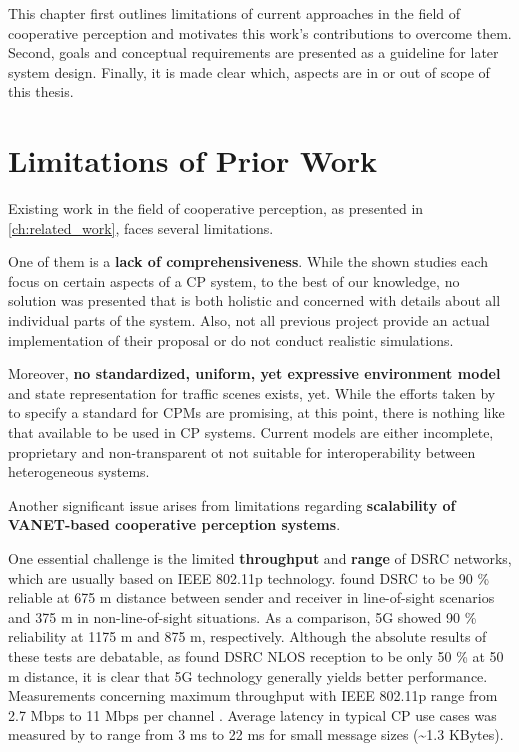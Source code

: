 This chapter first outlines limitations of current approaches in the field of cooperative perception and motivates this work's contributions to overcome them. Second, goals and conceptual requirements are presented as a guideline for later system design. Finally, it is made clear which, aspects are in or out of scope of this thesis.

\section{Limitations of Prior Work}
\label{sec:problem_analysis:limitations_of_prior_work}

Existing work in the field of cooperative perception, as presented in \autoref{ch:related_work}, faces several limitations.
\par
\bigskip

One of them is a \textbf{lack of comprehensiveness}. While the shown studies each focus on certain aspects of a CP system, to the best of our knowledge, no solution was presented that is both holistic and concerned with details about all individual parts of the system. Also, not all previous project provide an actual implementation of their proposal or do not conduct realistic simulations.
\par
\bigskip

Moreover, \textbf{no standardized, uniform, yet expressive environment model} and state representation for traffic scenes exists, yet. While the efforts taken by \cite{EuropeanTelecommunicationsStandardsInstituteETSI2019} to specify a standard for CPMs are promising, at this point, there is nothing like that available to be used in CP systems. Current models are either incomplete, proprietary and non-transparent ot not suitable for interoperability between heterogeneous systems. 
\par
\bigskip

Another significant issue arises from limitations regarding \textbf{scalability of VANET-based cooperative perception systems}.

One essential challenge is the limited \textbf{throughput} and \textbf{range} of DSRC networks, which are usually based on IEEE 802.11p technology. \cite{5GAutomotiveAssociation2018} found DSRC to be 90 \% reliable at 675 m distance between sender and receiver in line-of-sight scenarios and 375 m in non-line-of-sight situations. As a comparison, 5G showed 90 \% reliability at 1175 m and 875 m, respectively. Although the absolute results of these tests are debatable, as \cite{Mangel2011} found DSRC NLOS reception to be only 50 \% at 50 m distance, it is clear that 5G technology generally yields better performance. Measurements concerning maximum throughput with IEEE 802.11p range from 2.7 Mbps to 11 Mbps per channel \cite{Chen2016, Wang2013}. Average latency in typical CP use cases was measured by \cite{Rauch2011} to range from 3 ms to 22 ms for small message sizes (\textasciitilde 1.3 KBytes).

